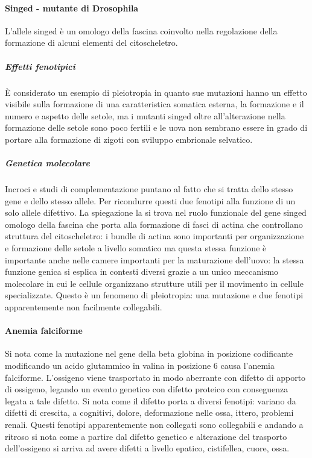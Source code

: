 \paragraph{Singed - mutante di Drosophila}
L'allele singed \`e un omologo della fascina coinvolto nella regolazione della formazione di alcuni elementi del citoscheletro. 
\subparagraph{Effetti fenotipici}
\`E considerato un esempio di 
pleiotropia in quanto sue mutazioni hanno un effetto visibile sulla formazione di una caratteristica somatica esterna, la formazione e il numero e aspetto delle setole, ma i mutanti 
singed oltre all'alterazione nella formazione delle setole sono poco fertili e le uova non sembrano essere in grado di portare alla formazione di zigoti con sviluppo embrionale 
selvatico. 
\subparagraph{Genetica molecolare}
Incroci e studi di complementazione puntano al fatto che si tratta dello stesso gene e dello stesso allele. Per ricondurre questi due
fenotipi alla funzione di un solo allele difettivo. La spiegazione la si trova nel ruolo funzionale del gene singed omologo della fascina che porta alla formazione di fasci di actina
che controllano struttura del citoscheletro: i bundle di actina sono importanti per organizzazione e formazione delle setole a livello somatico ma questa stessa funzione \`e importante
anche nelle camere importanti per la maturazione dell'uovo: la stessa funzione genica si esplica in contesti diversi grazie a un unico meccanismo molecolare in cui le cellule 
organizzano strutture utili per il movimento in cellule specializzate. Questo \`e un fenomeno di pleiotropia: una mutazione e due fenotipi apparentemente non facilmente collegabili. 
\paragraph{Anemia falciforme}
Si nota come la mutazione nel gene della beta globina in posizione codificante modificando un acido glutammico in valina in posizione $6$ causa
l'anemia falciforme. L'ossigeno viene trasportato in modo aberrante con difetto di apporto di ossigeno, legando un evento genetico con difetto proteico con conseguenza legata a tale
difetto. Si nota come il difetto porta a diversi fenotipi: variano da difetti di crescita, a cognitivi, dolore, deformazione nelle ossa, ittero, problemi renali. Questi fenotipi 
apparentemente non collegati sono collegabili e andando a ritroso si nota come a partire dal difetto genetico e alterazione del trasporto dell'ossigeno si arriva ad avere difetti a 
livello epatico, cistifellea, cuore, ossa.
